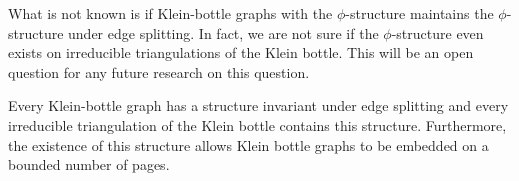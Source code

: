 What is not known is if Klein-bottle graphs with the $\phi$-structure maintains the $\phi$-structure under edge splitting. In fact, we are not sure if the $\phi$-structure even exists on irreducible triangulations of the Klein bottle. This will be an open question for any future research on this question.

\begin{conjecture}
    Every Klein-bottle graph has a structure invariant under edge splitting and every irreducible triangulation of the Klein bottle contains this structure. Furthermore, the existence of this structure allows Klein bottle graphs to be embedded on a bounded number of pages.
\end{conjecture}